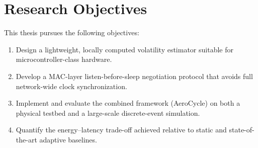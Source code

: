 \section{Research Objectives}
This thesis pursues the following objectives:
\begin{enumerate}[label=\textbf{O\arabic*.}, leftmargin=2.2em]
  \item Design a lightweight, locally computed volatility estimator suitable for
        microcontroller-class hardware.
  \item Develop a MAC-layer listen-before-sleep negotiation protocol that avoids full
        network-wide clock synchronization.
  \item Implement and evaluate the combined framework (AeroCycle) on both a physical testbed
        and a large-scale discrete-event simulation.
  \item Quantify the energy--latency trade-off achieved relative to static and
        state-of-the-art adaptive baselines.
\end{enumerate}
